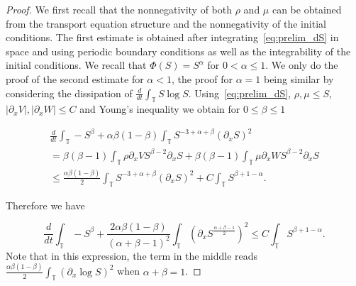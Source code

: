 \documentclass[a4paper,twosided, 11pt]{article}
\newcommand {\T}  { {\mathbb{T}} }
\theoremstyle{plain}
\theoremstyle{remark}
\numberwithin{equation}{section}
\begin{document}
\begin{proof}
We first recall that the nonnegativity of both $\rho$ and $\mu$ can be obtained from the transport equation structure and the nonnegativity of the initial conditions. The first estimate is obtained after integrating~\eqref{eq:prelim_dS} in space and using periodic boundary conditions as well as the integrability of the initial conditions. 
We recall that $\Phi(S)= S^{\alpha}$ for $0< \alpha\le 1$. We only do the proof of the second estimate for $\alpha<1$, the proof for $\alpha=1$ being similar by considering the dissipation of $\frac{d}{dt}\int_{\T}S\log S$.
 Using~\eqref{eq:prelim_dS}, $\rho,\mu\le S$,  $|\partial_x V|, |\partial_x W|\le C$ and Young's inequality we obtain for $0\le \beta\le  1$

\begin{multline*}
\frac{d}{dt}\int_{\T}-S^{\beta}  + \alpha\beta(1-\beta)\int_{\T}S^{-3+\alpha+\beta}(\partial_x S)^2 \\= \beta(\beta-1)\int_{\T}\rho\partial_x V S^{\beta-2}\partial_xS+ \beta(\beta-1)\int_{\T}\mu\partial_x W S^{\beta-2}\partial_xS\\
\le \frac{\alpha\beta(1-\beta)}{2}\int_{\T}S^{-3+\alpha+\beta}(\partial_x S)^2 + C \int_{\T}S^{\beta+1-\alpha}.
\end{multline*}

Therefore we have

\begin{equation*}
\frac{d}{dt}\int_{\T}-S^{\beta} + \frac{2\alpha\beta(1-\beta)}{(\alpha+\beta-1)^2}\int_{\T}\left(\partial_x S^{\frac{\alpha+\beta-1}{2}}\right)^2 \le  C \int_{\T}S^{\beta+1-\alpha}.
\end{equation*}
Note that in this expression, the term in the middle reads $\frac{\alpha\beta(1-\beta)}{2}\int_\T \left(\partial_x \log S\right)^2$ when $\alpha+\beta=1$.


\end{proof}
\end{document}
